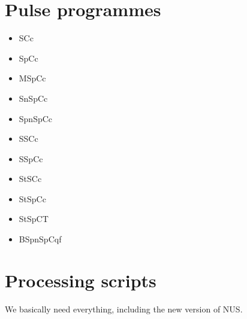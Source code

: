 \section{Pulse programmes}

\begin{itemize}
    \item SCc
    \item SpCc
    \item MSpCc
    \item SnSpCc
    \item SpnSpCc
    \item SSCc
    \item SSpCc
    \item StSCc
    \item StSpCc
    \item StSpCT
    \item BSpnSpCqf
\end{itemize}

\section{Processing scripts}

We basically need everything, including the new version of NUS.
